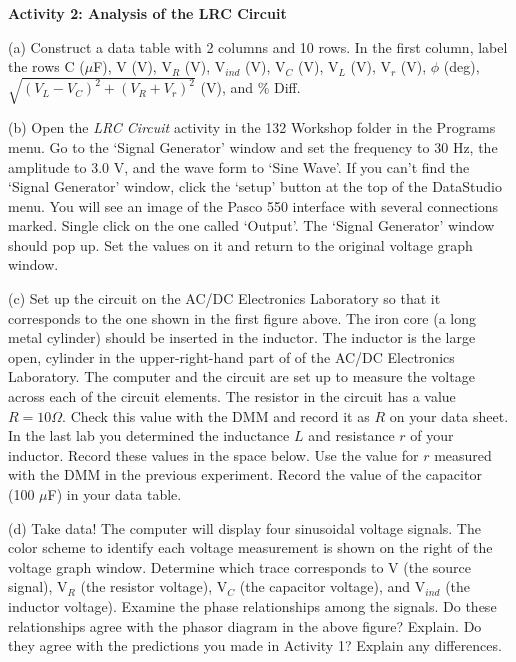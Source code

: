 \newpage

\textbf{Activity 2: Analysis of the LRC Circuit }

(a) Construct a data table with 2 columns and 10 rows. In the first
column, label the rows C (\( \mu  \)F), V (V), V\( _{R} \) (V),
V\( _{ind} \) (V), V\( _{C} \) (V), V\( _{L} \) (V), V\( _{r} \)
(V), \( \phi  \) (deg), \( \sqrt{(V_{L}-V_{C})^{2}+(V_{R}+V_{r})^{2}} \)
(V), and \% Diff.
\vspace{5in}

(b) Open the \emph{LRC Circuit} activity
in the 132 Workshop folder in the Programs menu. 
Go to the `Signal Generator' window and set the frequency to 30 Hz, the amplitude 
to 3.0 V, and the wave form to `Sine Wave'.
If you can't find the `Signal Generator' window, click the `setup' button at
the top of the DataStudio menu.
You will see an image of the Pasco 550 interface with several
connections marked.
Single click on the one called `Output'.
The `Signal Generator' window should pop up. 
Set the values on it and return to the original voltage graph window.

(c) Set up the circuit on the AC/DC Electronics Laboratory so that it corresponds to the one
shown in the first figure above. The iron core (a long metal cylinder)
should be inserted in the inductor.
The inductor is the large open, cylinder in the upper-right-hand part of
of the AC/DC Electronics Laboratory.
The computer and the circuit are set up to measure the voltage
across each of the circuit elements. The resistor in the circuit 
has a value $R=10\Omega$. Check this value with the DMM and record it
as $R$ on your data sheet. In the last lab you determined the inductance
$L$ and resistance $r$ of your inductor. Record these values in the space
below. Use the value for $r$ measured with the DMM in the previous experiment.
Record the value of the capacitor (100 \( \mu  \)F) in your data table.
\vspace{15mm}

(d) Take data! The computer will display four sinusoidal
voltage signals. 
The color scheme to identify each voltage measurement
is shown on the right of the voltage graph window. Determine which trace
corresponds to V (the source signal), V\( _{R} \) (the resistor voltage),
V\( _{C} \) (the capacitor voltage), and V\( _{ind} \) (the inductor voltage).
Examine
the phase relationships among the signals. Do these relationships
agree with the phasor diagram in the above figure? Explain.
Do they agree with the predictions you made in Activity 1?
Explain any differences.
\answerspace{20mm}

